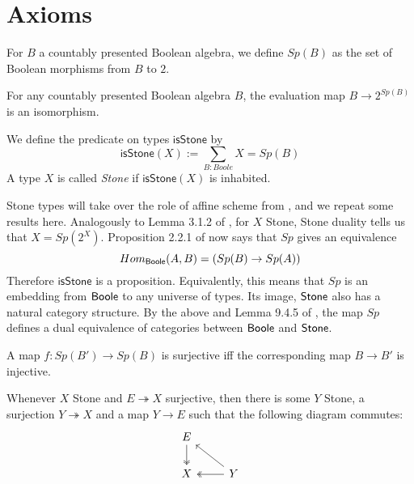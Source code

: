 \documentclass{../util/zariski-small}
\begin{document}
\section{Axioms}
\begin{definition}
  For $B$ a countably presented Boolean algebra, we define $Sp(B)$ as the set of Boolean morphisms from $B$ to $2$. 
\end{definition}
\begin{axiomNum}
  For any countably presented Boolean algebra $B$, the evaluation map $B\rightarrow  2^{Sp(B)}$ is an isomorphism.
\end{axiomNum} 
\newcommand{\isSt}{\mathsf{isStone}}
\begin{definition}
  We define the predicate on types $\isSt$ by 
  \begin{equation}
    \isSt(X) := \sum\limits_{B : Boole} X = Sp(B)
  \end{equation} 
  A type $X$ is called \textit{Stone} if $\isSt(X)$ is inhabited.
\end{definition}

\begin{remark}
Stone types will take over the role of affine scheme from \cite{draft}, 
and we repeat some results here. 
Analogously to Lemma 3.1.2 of \cite{draft}, 
for $X$ Stone, Stone duality tells us that $X = Sp(2^X)$. 
%
Proposition 2.2.1 of \cite{draft} now says that 
$Sp$ gives an equivalence 
\begin{equation}
   Hom_{\mathsf{Boole}} (A, B) = (Sp(B) \to Sp(A))
\end{equation}
Therefore $\isSt$ is a proposition.
Equivalently, 
this means that 
$Sp$ is an embedding from $\mathsf{Boole}$ to any universe of types.
Its image, $\mathsf{Stone}$ also has a natural category structure.
By the above and Lemma 9.4.5 of \cite{hott}, 
the map $Sp$ defines a dual equivalence of categories between $\mathsf{Boole}$ and $\mathsf{Stone}$.
\end{remark}

\begin{axiomNum}
  A map $f:Sp(B')\to Sp(B)$ is surjective iff the corresponding map $B \to B'$ is injective.
\end{axiomNum} 
\begin{axiomNum}
  Whenever $X$ Stone and $E\twoheadrightarrow X$ surjective, then there is some $Y$ Stone,
    a surjection $Y \twoheadrightarrow X$ and a map $Y\to E$ such that the following diagram commutes:
    \begin{equation}\begin{tikzcd}
      E \arrow[d,""',two heads]\\
      X & \arrow[l, "", two heads] Y\arrow[lu, ""']
    \end{tikzcd}\end{equation}  
\end{axiomNum} 
\end{document}
